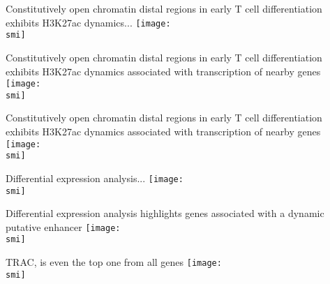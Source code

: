 \documentclass[10pt]{beamer}
\def\smi{out/ln/updir/mw-gcthesis-oral/library.bib}
\begin{document}
    \begin{frame}{Constitutively open chromatin distal regions in early T cell differentiation exhibits H3K27ac dynamics...}
      \def\smi{out/ln/updir/mw-gcthesis-oral/ink/atac-clusters/h3k27ac.pdf}
      \texttt{[image: \\smi]}
    \end{frame}
    \begin{frame}{Constitutively open chromatin distal regions in early T cell differentiation exhibits H3K27ac dynamics associated with transcription of nearby genes}
      \def\smi{out/ln/updir/mw-gcthesis-oral/ink/atac-clusters/rnaseq-h3k27ac-no-casero.pdf}
      \texttt{[image: \\smi]}
    \end{frame}
    \begin{frame}{Constitutively open chromatin distal regions in early T cell differentiation exhibits H3K27ac dynamics associated with transcription of nearby genes}
      \def\smi{out/ln/updir/mw-gcthesis-oral/ink/atac-clusters/rnaseq-h3k27ac-with-casero.pdf}
      \texttt{[image: \\smi]}
    \end{frame}
    \begin{frame}{Differential expression analysis...}
      \def\smi{out/ln/updir/mw-gcthesis-oral/ink/atac-clusters/casero-violin-barplot.pdf}
      \texttt{[image: \\smi]}
    \end{frame}
    \begin{frame}{Differential expression analysis highlights genes associated with a dynamic putative enhancer}
      \def\smi{out/ln/updir/mw-gcthesis-oral/ink/atac-clusters/casero-violin-barplot-top-fc.pdf}
      \texttt{[image: \\smi]}
    \end{frame}
    \begin{frame}{TRAC, is even the top one from all genes}
      \def\smi{out/ln/updir/mw-gcthesis-oral/ink/casero-dear.pdf}
      \texttt{[image: \\smi]}%
    \end{frame}
\end{document}

